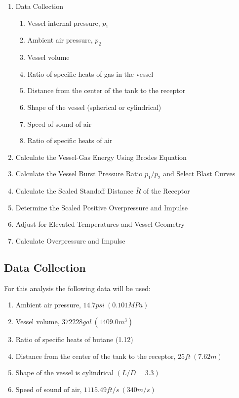 \documentclass[10pt,parskip=half,
toc=sectionentrywithdots,
bibliography=totocnumbered,
captions=tableheading,numbers=noendperiod]{scrartcl}
\providecommand{\tightlist}{%
  \setlength{\itemsep}{0pt}\setlength{\parskip}{0pt}}
\begin{document}
\begin{enumerate}
\def\labelenumi{\arabic{enumi}.}
\tightlist
\item
  Data Collection

  \begin{enumerate}
  \def\labelenumii{\alph{enumii}.}
  \tightlist
  \item
    Vessel internal pressure, \(p_1\)
  \item
    Ambient air pressure, \(p_2\)
  \item
    Vessel volume
  \item
    Ratio of specific heats of gas in the vessel
  \item
    Distance from the center of the tank to the receptor
  \item
    Shape of the vessel (spherical or cylindrical)
  \item
    Speed of sound of air
  \item
    Ratio of specific heats of air
  \end{enumerate}
\item
  Calculate the Vessel-Gas Energy Using Brodes Equation \cite{Brode1959}
\item
  Calculate the Vessel Burst Pressure Ratio \(p_1/p_2\) and Select Blast
  Curves
\item
  Calculate the Scaled Standoff Distance \(\overline R\) of the Receptor
  \cite{Baker1973}
\item
  Determine the Scaled Positive Overpressure and Impulse
\item
  Adjust for Elevated Temperatures and Vessel Geometry
\item
  Calculate Overpressure and Impulse
\end{enumerate}

\hypertarget{data-collection}{%
\subsection{Data Collection}\label{data-collection}}

For this analysis the following data will be used:

\begin{enumerate}
\def\labelenumi{\arabic{enumi}.}
\tightlist
\item
  Ambient air pressure, \(14.7psi\:(0.101MPa)\)
\item
  Vessel volume, \(372228gal\:(1409.0m^3)\)
\item
  Ratio of specific heats of butane (1.12)
\item
  Distance from the center of the tank to the receptor,
  \(25ft\:(7.62m)\)
\item
  Shape of the vessel is cylindrical \((L/D=3.3)\)
\item
  Speed of sound of air, \(1115.49 ft/s\:(340m/s)\)
\end{enumerate}
\end{document}
